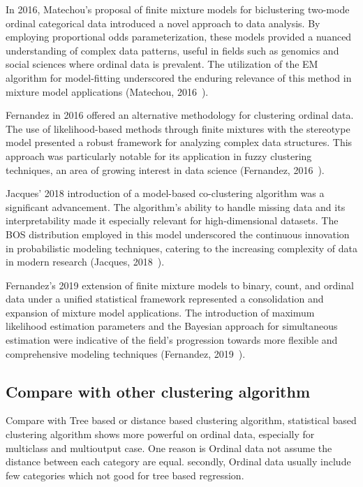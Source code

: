 \documentclass{article}
\begin{document}
In 2016, Matechou's proposal of finite mixture models for biclustering two-mode ordinal categorical data introduced a novel approach to data analysis. By employing proportional odds parameterization, these models provided a nuanced understanding of complex data patterns, useful in fields such as genomics and social sciences where ordinal data is prevalent. The utilization of the EM algorithm for model-fitting underscored the enduring relevance of this method in mixture model applications (Matechou, 2016~\cite{matechou2016biclustering}).

Fernandez in 2016 offered an alternative methodology for clustering ordinal data. The use of likelihood-based methods through finite mixtures with the stereotype model presented a robust framework for analyzing complex data structures. This approach was particularly notable for its application in fuzzy clustering techniques, an area of growing interest in data science (Fernandez, 2016~\cite{fernandez2016mixture}).

Jacques' 2018 introduction of a model-based co-clustering algorithm was a significant advancement. The algorithm's ability to handle missing data and its interpretability made it especially relevant for high-dimensional datasets. The BOS distribution employed in this model underscored the continuous innovation in probabilistic modeling techniques, catering to the increasing complexity of data in modern research (Jacques, 2018~\cite{jacques2018model}).

Fernandez's 2019 extension of finite mixture models to binary, count, and ordinal data under a unified statistical framework represented a consolidation and expansion of mixture model applications. The introduction of maximum likelihood estimation parameters and the Bayesian approach for simultaneous estimation were indicative of the field's progression towards more flexible and comprehensive modeling techniques (Fernandez, 2019~\cite{fernandez2019finite}).

\subsection*{Compare with other clustering algorithm}

Compare with Tree based or distance based clustering algorithm, statistical based clustering algorithm shows more powerful on ordinal data, especially for multiclass and multioutput case.
One reason is Ordinal data not assume the distance between each category are equal.
secondly, Ordinal data usually include few categories which not good for tree based regression.
\end{document}
